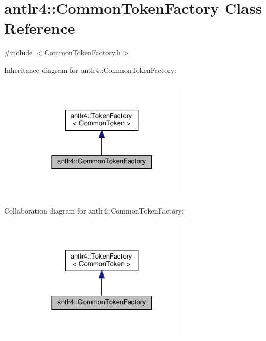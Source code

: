 \hypertarget{classantlr4_1_1CommonTokenFactory}{}\section{antlr4\+:\+:Common\+Token\+Factory Class Reference}
\label{classantlr4_1_1CommonTokenFactory}


{\ttfamily \#include $<$Common\+Token\+Factory.\+h$>$}



Inheritance diagram for antlr4\+:\+:Common\+Token\+Factory\+:
\nopagebreak
\begin{figure}[H]
\begin{center}
\leavevmode
\includegraphics[width=226pt]{classantlr4_1_1CommonTokenFactory__inherit__graph}
\end{center}
\end{figure}


Collaboration diagram for antlr4\+:\+:Common\+Token\+Factory\+:
\nopagebreak
\begin{figure}[H]
\begin{center}
\leavevmode
\includegraphics[width=226pt]{classantlr4_1_1CommonTokenFactory__coll__graph}
\end{center}
\end{figure}
